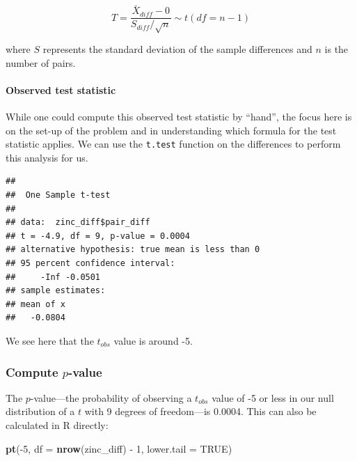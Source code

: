\documentclass[]{tufte-book}
\newenvironment{Shaded}{\begin{snugshade}}{\end{snugshade}}
\newcommand{\KeywordTok}[1]{\textcolor[rgb]{0.13,0.29,0.53}{\textbf{{#1}}}}
\newcommand{\DataTypeTok}[1]{\textcolor[rgb]{0.13,0.29,0.53}{{#1}}}
\newcommand{\DecValTok}[1]{\textcolor[rgb]{0.00,0.00,0.81}{{#1}}}
\newcommand{\StringTok}[1]{\textcolor[rgb]{0.31,0.60,0.02}{{#1}}}
\newcommand{\OtherTok}[1]{\textcolor[rgb]{0.56,0.35,0.01}{{#1}}}
\newcommand{\NormalTok}[1]{{#1}}
\theoremstyle{definition}
\theoremstyle{definition}
\theoremstyle{remark}
\begin{document}
\[ T =\dfrac{ \bar{X}_{diff} - 0}{ S_{diff} / \sqrt{n} } \sim t (df = n - 1) \]

where \(S\) represents the standard deviation of the sample differences
and \(n\) is the number of pairs.

\paragraph{Observed test statistic}\label{observed-test-statistic-4}

While one could compute this observed test statistic by ``hand'', the
focus here is on the set-up of the problem and in understanding which
formula for the test statistic applies. We can use the \texttt{t.test}
function on the differences to perform this analysis for us.

\begin{Shaded}
\end{Shaded}

\begin{verbatim}
## 
##  One Sample t-test
## 
## data:  zinc_diff$pair_diff
## t = -4.9, df = 9, p-value = 0.0004
## alternative hypothesis: true mean is less than 0
## 95 percent confidence interval:
##     -Inf -0.0501
## sample estimates:
## mean of x 
##   -0.0804
\end{verbatim}

We see here that the \(t_{obs}\) value is around -5.

\subsubsection{\texorpdfstring{Compute
\(p\)-value}{Compute p-value}}\label{compute-p-value-3}

The \(p\)-value---the probability of observing a \(t_{obs}\) value of -5
or less in our null distribution of a \(t\) with 9 degrees of
freedom---is 0.0004. This can also be calculated in R directly:

\begin{Shaded}
\begin{Highlighting}[]
\KeywordTok{pt}\NormalTok{(-}\DecValTok{5}\NormalTok{, }\DataTypeTok{df =} \KeywordTok{nrow}\NormalTok{(zinc_diff) -}\StringTok{ }\DecValTok{1}\NormalTok{, }\DataTypeTok{lower.tail =} \OtherTok{TRUE}\NormalTok{)}
\end{Highlighting}
\end{Shaded}
\end{document}
